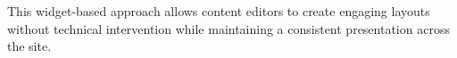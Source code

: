 This widget-based approach allows content editors to create engaging layouts without technical intervention while maintaining a consistent presentation across the site.



